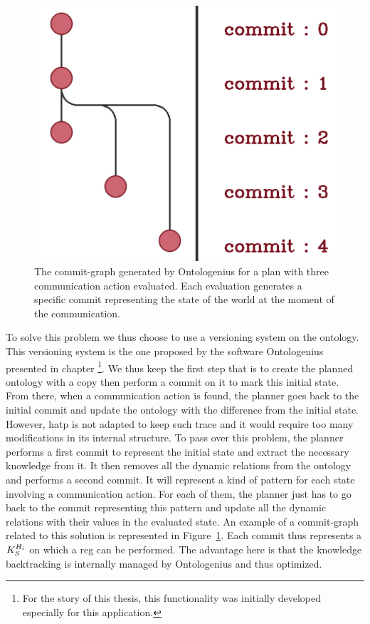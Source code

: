 \begin{figure}[!ht]
\centering
\includegraphics[scale=0.3]{figures/chapter5/versioning_simple.png}
\caption{\label{fig:chap5_versioning_simple} The commit-graph generated by Ontologenius for a plan with three communication action evaluated. Each evaluation generates a specific commit representing the state of the world at the moment of the communication. }
\end{figure}

To solve this problem we thus choose to use a versioning system on the ontology. This versioning system is the one proposed by the software Ontologenius presented in chapter  \footnote{For the story of this thesis, this functionality was initially developed especially for this application.}. We thus keep the first step that is to create the planned ontology with a copy then perform a commit on it to mark this initial state. From there, when a communication action is found, the planner goes back to the initial commit and update the ontology with the difference from the initial state. However, \acrshort{hatp} is not adapted to keep such trace and it would require too many modifications in its internal structure. To pass over this problem, the planner performs a first commit to represent the initial state and extract the necessary knowledge from it. It then removes all the dynamic relations from the ontology and performs a second commit. It will represent a kind of pattern for each state involving a communication action. For each of them, the planner just has to go back to the commit representing this pattern and update all the dynamic relations with their values in the evaluated state. An example of a commit-graph related to this solution is represented in Figure~\ref{fig:chap5_versioning_simple}. Each commit thus represents a $K_S^{H_i}$ on which a \acrshort{reg} can be performed. The advantage here is that the knowledge backtracking is internally managed by Ontologenius and thus optimized.

